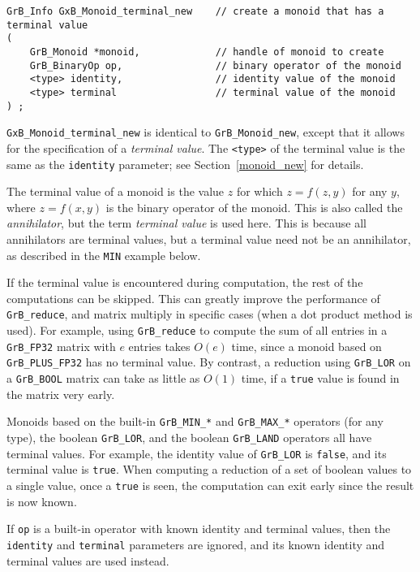 \documentclass[12pt]{article}
\begin{document}
\begin{mdframed}[userdefinedwidth=6in]
{\footnotesize
\begin{verbatim}
GrB_Info GxB_Monoid_terminal_new    // create a monoid that has a terminal value
(
    GrB_Monoid *monoid,             // handle of monoid to create
    GrB_BinaryOp op,                // binary operator of the monoid
    <type> identity,                // identity value of the monoid
    <type> terminal                 // terminal value of the monoid
) ;
\end{verbatim}
} \end{mdframed}

\verb'GxB_Monoid_terminal_new' is identical to \verb'GrB_Monoid_new', except
that it allows for the specification of a {\em terminal value}.  The
\verb'<type>' of the terminal value is the same as the \verb'identity'
parameter; see Section~\ref{monoid_new} for details.

The terminal value of a monoid is the value $z$ for which $z=f(z,y)$ for any
$y$, where $z=f(x,y)$ is the binary operator of the monoid.  This is also
called the {\em annihilator}, but the term {\em terminal value} is used here.
This is because all annihilators are terminal values, but a terminal value need
not be an annihilator, as described in the \verb'MIN' example below.

If the terminal value is encountered during computation, the rest of the
computations can be skipped.  This can greatly improve the performance of
\verb'GrB_reduce', and matrix multiply in specific cases (when a dot product
method is used).  For example, using \verb'GrB_reduce' to compute the sum of
all entries in a \verb'GrB_FP32' matrix with $e$ entries takes $O(e)$ time,
since a monoid based on \verb'GrB_PLUS_FP32' has no terminal value.  By
contrast, a reduction using \verb'GrB_LOR' on a \verb'GrB_BOOL' matrix can take
as little as $O(1)$ time, if a \verb'true' value is found in the matrix very
early.

Monoids based on the built-in \verb'GrB_MIN_*' and \verb'GrB_MAX_*' operators
(for any type), the boolean \verb'GrB_LOR', and the boolean \verb'GrB_LAND'
operators all have terminal values.  For example, the identity value of
\verb'GrB_LOR' is \verb'false', and its terminal value is \verb'true'.  When
computing a reduction of a set of boolean values to a single value, once a
\verb'true' is seen, the computation can exit early since the result is now
known.

If \verb'op' is a built-in operator with known identity and terminal values,
then the \verb'identity' and \verb'terminal' parameters are ignored, and its
known identity and terminal values are used instead.
\end{document}
